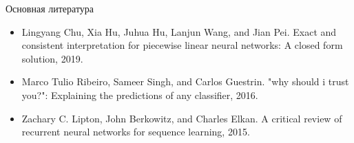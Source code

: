 \documentclass{beamer}
\begin{document}
\begin{frame}{Основная литература}
    \begin{itemize}
        \item Lingyang Chu, Xia Hu, Juhua Hu, Lanjun Wang, and Jian Pei. Exact and consistent
interpretation for piecewise linear neural networks: A closed form solution, 2019.
        \item Marco Tulio Ribeiro, Sameer Singh, and Carlos Guestrin. "why should i trust you?":
Explaining the predictions of any classifier, 2016.
        \item Zachary C. Lipton, John Berkowitz, and Charles Elkan. A critical review of recurrent
neural networks for sequence learning, 2015.
    \end{itemize}
\end{frame}
\end{document}
